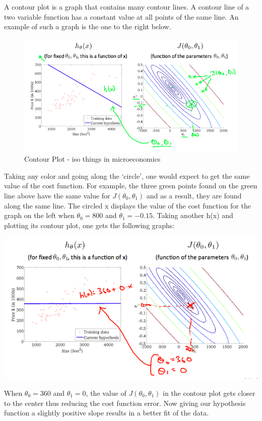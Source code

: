 \documentclass[
]{book}
\begin{document}
A contour plot is a graph that contains many contour lines. A contour line of a two variable function has a constant value at all points of the same line. An example of such a graph is the one to the right below.

\begin{figure}
\centering
\includegraphics{contour.png}
\caption{Contour Plot - iso things in microeconomics}
\end{figure}

Taking any color and going along the `circle', one would expect to get the same value of the cost function. For example, the three green points found on the green line above have the same value for \(J(\theta_0,\theta_1)\) and as a result, they are found along the same line. The circled x displays the value of the cost function for the graph on the left when \(\theta_0 = 800\) and \(\theta_1 = -0.15\). Taking another h(x) and plotting its contour plot, one gets the following graphs:

\includegraphics{cost_function_intution2_graph2.png}

When \(\theta_0 = 360\) and \(\theta_1 = 0\), the value of \(J(\theta_0,\theta_1)\) in the contour plot gets closer to the center thus reducing the cost function error. Now giving our hypothesis function a slightly positive slope results in a better fit of the data.
\end{document}
